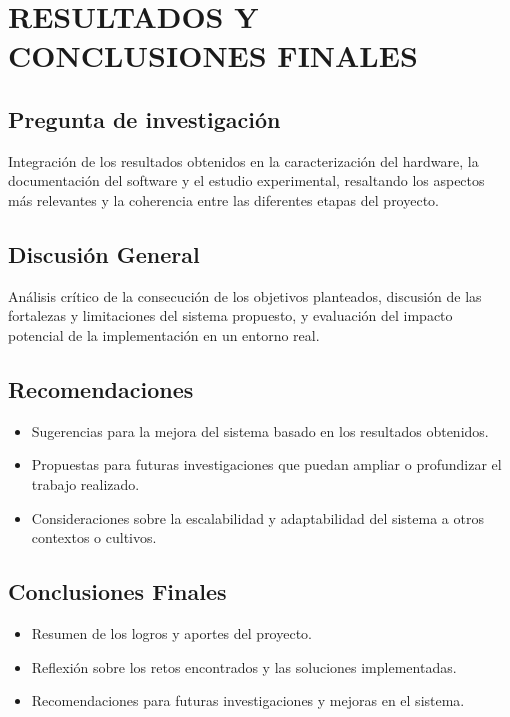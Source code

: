 \chapter{RESULTADOS Y CONCLUSIONES FINALES}

\section{Pregunta de investigación}
Integración de los resultados obtenidos en la caracterización del hardware, la documentación del software y el estudio experimental, resaltando los aspectos más relevantes y la coherencia entre las diferentes etapas del proyecto.

\section{Discusión General}
Análisis crítico de la consecución de los objetivos planteados, discusión de las fortalezas y limitaciones del sistema propuesto, y evaluación del impacto potencial de la implementación en un entorno real.

\section{Recomendaciones}
\begin{itemize}
    \item Sugerencias para la mejora del sistema basado en los resultados obtenidos.
    \item Propuestas para futuras investigaciones que puedan ampliar o profundizar el trabajo realizado.
    \item Consideraciones sobre la escalabilidad y adaptabilidad del sistema a otros contextos o cultivos.
\end{itemize}

\section{Conclusiones Finales}
\begin{itemize}
    \item Resumen de los logros y aportes del proyecto.
    \item Reflexión sobre los retos encontrados y las soluciones implementadas.
    \item Recomendaciones para futuras investigaciones y mejoras en el sistema.
\end{itemize}